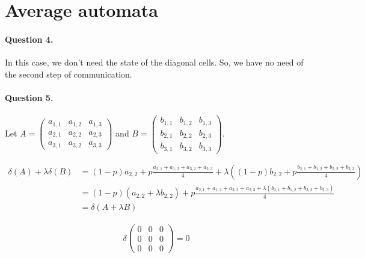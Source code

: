 \section{Average automata}

\paragraph{Question 4.}

In this case, we don't need the state of the diagonal cells. So, we have no need of the second step of communication.

\paragraph{Question 5.}

Let $A=
        \left(
            \begin{matrix}
                a_{1,1} & a_{1,2} & a_{1,3} \\ 
                a_{2,1} & a_{2,2} & a_{2,3} \\ 
                a_{3,1} & a_{3,2} & a_{3,3}
            \end{matrix}
        \right)$
         and 
    $B = 
        \left(
            \begin{matrix}
                b_{1,1} & b_{1,2} & b_{1,3} \\ 
                b_{2,1} & b_{2,2} & b_{2,3} \\ 
                b_{3,1} & b_{3,2} & b_{3,3}
            \end{matrix}
        \right)$.

$$
    \begin{aligned}
        \delta(A) + \lambda\delta(B) &= (1-p) a_{2,2} + p\frac{a_{2,1}+a_{1,2}+a_{3,2}+a_{2,3}}{4} + \lambda\left( (1-p) b_{2,2} + p\frac{b_{2,1}+b_{1,2}+b_{3,2}+b_{2,3}}{4} \right)\\
        &= (1-p) (a_{2,2} + \lambda b_{2,2}) + p\frac{a_{2,1}+a_{1,2}+a_{3,2}+a_{2,3} + \lambda (b_{2,1}+b_{1,2}+b_{3,2}+b_{2,3})}{4}\\
        &=\delta(A + \lambda B)
    \end{aligned}
$$

$$
    \begin{aligned}
        \delta\left(
            \begin{matrix}
                0 & 0 & 0 \\ 
                0 & 0 & 0 \\ 
                0 & 0 & 0
            \end{matrix}
        \right)
        = 0
    \end{aligned}
$$

